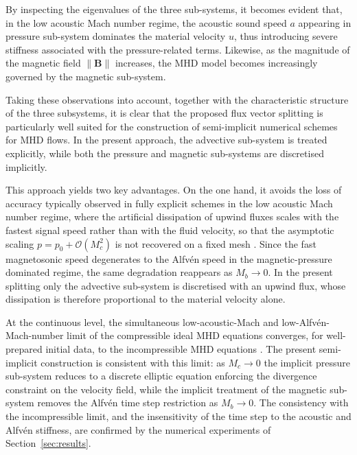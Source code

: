 \documentclass[a4paper,fleqn]{cas-sc}
\theoremstyle{definition}
\theoremstyle{remark}
\begin{document}
By inspecting the eigenvalues of the three sub-systems, it becomes evident that, in the low acoustic Mach number regime, the acoustic sound speed $a$ appearing in pressure sub-system dominates the material velocity $u$, thus introducing severe stiffness associated with the pressure-related terms.
Likewise, as the magnitude of the magnetic field $\|\mathbf B\|$ increases, the MHD model becomes increasingly governed by the magnetic sub-system.

Taking these observations into account, together with the characteristic structure of the three subsystems, it is clear that the proposed flux vector splitting is particularly well suited for the construction of semi-implicit numerical schemes for MHD flows. In the present approach, the advective sub-system is treated explicitly, while both the pressure and magnetic sub-systems are discretised implicitly.


This approach yields two key advantages. On the one hand, it avoids the loss of accuracy
typically observed in fully explicit schemes in the low acoustic Mach number regime, where the
artificial dissipation of upwind fluxes scales with the fastest signal speed rather than
with the fluid velocity, so that the asymptotic scaling $p = p_0 + \mathcal{O}(M_c^2)$ is
not recovered on a fixed mesh \cite{GuillardViozat2017,Dellacherie2010}. Since the fast
magnetosonic speed degenerates to the Alfv\'en speed in the magnetic-pressure dominated
regime, the same degradation reappears as $M_b \to 0$. In the present splitting only the
advective sub-system is discretised with an upwind flux, whose dissipation is therefore
proportional to the material velocity alone.







At the continuous level, the simultaneous low-acoustic-Mach and low-Alfvén-Mach-number limit of
the compressible ideal MHD equations converges, for well-prepared initial data, to
the incompressible MHD equations \cite{ChengJuSchochet2021}. The
present semi-implicit construction is consistent with this limit: as $M_c\to 0$ the
implicit pressure sub-system reduces to a discrete elliptic equation enforcing the
divergence constraint on the velocity field, while the implicit treatment of the
magnetic sub-system removes the Alfvén time step restriction as $M_b\to 0$. The consistency with the incompressible limit, and the insensitivity
of the time step to the acoustic and Alfvén stiffness,
are confirmed by the numerical experiments of Section~\ref{sec:results}.
\end{document}
